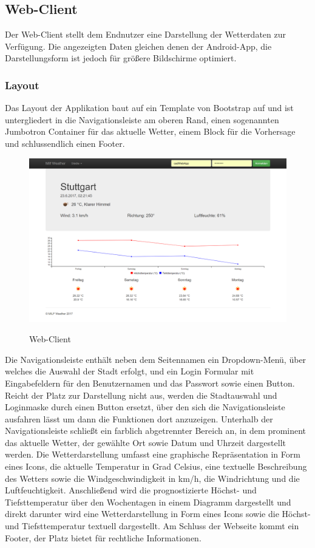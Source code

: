 \subsection{Web-Client} \label{Web-Client}
Der Web-Client stellt dem Endnutzer eine Darstellung der Wetterdaten zur Verfügung. Die angezeigten Daten gleichen denen der Android-App, die Darstellungsform ist jedoch für größere Bildschirme optimiert. 
\subsubsection{Layout}
Das Layout der Applikation baut auf ein Template von Bootstrap auf und ist untergliedert in die Navigationsleiste am oberen Rand, einen sogenannten Jumbotron Container für das aktuelle Wetter, einem Block für die Vorhersage und schlussendlich einen Footer. 
\begin{figure}[htbp]
	\centering
	\includegraphics[width=1.0\textwidth]{Bilder/Web-Client.png}
	\caption{Web-Client}\cite{webc:1}
	\label{img:webclient}
\end{figure}
Die Navigationsleiste enthält neben dem Seitennamen ein Dropdown-Menü, über welches die Auswahl der Stadt erfolgt, und ein Login Formular mit Eingabefeldern für den Benutzernamen und das Passwort sowie einen Button. Reicht der Platz zur Darstellung nicht aus, werden die Stadtauswahl und Loginmaske durch einen Button ersetzt, über den sich die Navigationsleiste ausfahren lässt um dann die Funktionen dort anzuzeigen.
Unterhalb der Navigationsleiste schließt ein farblich abgetrennter Bereich an, in dem prominent das aktuelle Wetter, der gewählte Ort sowie Datum und Uhrzeit dargestellt werden. Die Wetterdarstellung umfasst eine graphische Repräsentation in Form eines Icons, die aktuelle Temperatur in Grad Celsius, eine textuelle Beschreibung des Wetters sowie die Windgeschwindigkeit in km/h, die Windrichtung und die Luftfeuchtigkeit.
Anschließend wird die prognostizierte Höchst- und Tiefsttemperatur über den Wochentagen in einem Diagramm dargestellt und direkt darunter wird eine Wetterdarstellung in Form eines Icons sowie die Höchst- und Tiefsttemperatur textuell dargestellt.
Am Schluss der Webseite kommt ein Footer, der Platz bietet für rechtliche Informationen.

